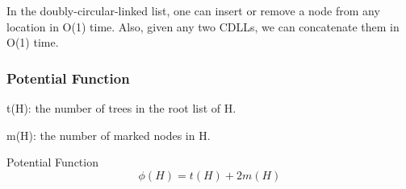     In the doubly-circular-linked list, one can insert or remove a node from any location
    in O(1) time. Also, given any two CDLLs, we can concatenate them in 
    O(1) time.


\subsubsection*{Potential Function}

    t(H): the number of trees in the root list of H.

    m(H): the number of marked nodes in H.
   
    Potential Function
    \begin{equation*}
        \phi(H) = t(H) + 2m(H)
    \end{equation*}


















